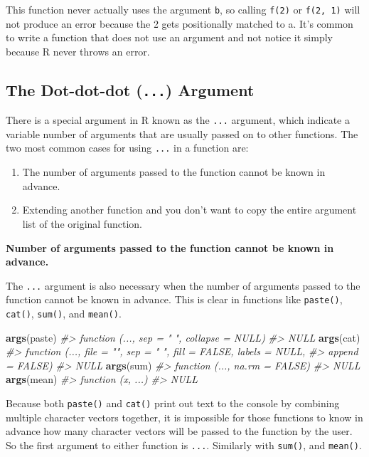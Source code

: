 \documentclass[]{book}
\newenvironment{Shaded}{\begin{snugshade}}{\end{snugshade}}
\newcommand{\KeywordTok}[1]{\textcolor[rgb]{0.13,0.29,0.53}{\textbf{#1}}}
\newcommand{\CommentTok}[1]{\textcolor[rgb]{0.56,0.35,0.01}{\textit{#1}}}
\newcommand{\NormalTok}[1]{#1}
\providecommand{\tightlist}{%
  \setlength{\itemsep}{0pt}\setlength{\parskip}{0pt}}
\begin{document}
This function never actually uses the argument \texttt{b}, so calling
\texttt{f(2)} or \texttt{f(2,\ 1)} will not produce an error because the
2 gets positionally matched to a. It's common to write a function that
does not use an argument and not notice it simply because R never throws
an error.

\subsection{\texorpdfstring{The Dot-dot-dot (\texttt{...})
Argument}{The Dot-dot-dot (...) Argument}}\label{the-dot-dot-dot-...-argument}

There is a special argument in R known as the \texttt{...} argument,
which indicate a variable number of arguments that are usually passed on
to other functions. The two most common cases for using \texttt{...} in
a function are:

\begin{enumerate}
\def\labelenumi{\arabic{enumi}.}
\tightlist
\item
  The number of arguments passed to the function cannot be known in
  advance.
\item
  Extending another function and you don't want to copy the entire
  argument list of the original function.
\end{enumerate}

\textbf{Number of arguments passed to the function cannot be known in
advance.}

The \texttt{...} argument is also necessary when the number of arguments
passed to the function cannot be known in advance. This is clear in
functions like \texttt{paste()}, \texttt{cat()}, \texttt{sum()}, and
\texttt{mean()}.

\begin{Shaded}
\begin{Highlighting}[]
\KeywordTok{args}\NormalTok{(paste)}
\CommentTok{#> function (..., sep = " ", collapse = NULL) }
\CommentTok{#> NULL}
\KeywordTok{args}\NormalTok{(cat)}
\CommentTok{#> function (..., file = "", sep = " ", fill = FALSE, labels = NULL, }
\CommentTok{#>     append = FALSE) }
\CommentTok{#> NULL}
\KeywordTok{args}\NormalTok{(sum)}
\CommentTok{#> function (..., na.rm = FALSE) }
\CommentTok{#> NULL}
\KeywordTok{args}\NormalTok{(mean)}
\CommentTok{#> function (x, ...) }
\CommentTok{#> NULL}
\end{Highlighting}
\end{Shaded}

Because both \texttt{paste()} and \texttt{cat()} print out text to the
console by combining multiple character vectors together, it is
impossible for those functions to know in advance how many character
vectors will be passed to the function by the user. So the first
argument to either function is \texttt{...}. Similarly with
\texttt{sum()}, and \texttt{mean()}.
\end{document}
